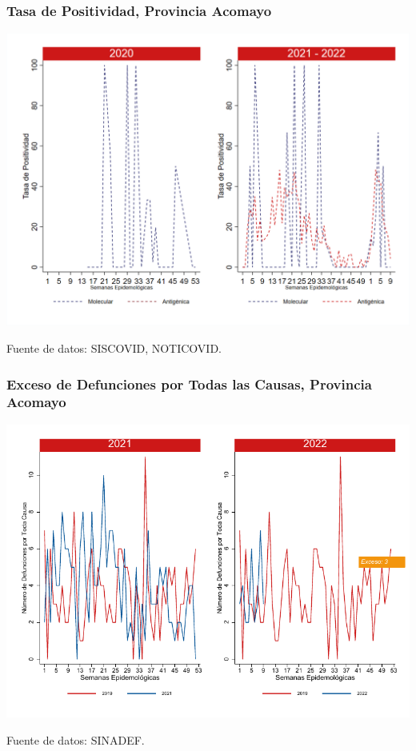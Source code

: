 \documentclass[xcolor=table]{beamer}
\begin{document}
\begin{frame}
	\frametitle{Tasa de Positividad, Provincia Acomayo}
	\vspace{-.5cm}
	\begin{center}
		\includegraphics[width=0.8\linewidth, trim={0cm .5cm 0cm 0.2cm},clip]{../figuras/positividad_20_21_1.png}
	\end{center}
	{\tiny Fuente de datos: SISCOVID, NOTICOVID.}
\end{frame}

\begin{frame}
	\frametitle{Exceso de Defunciones por Todas las Causas, Provincia Acomayo}
	\vspace{-.5cm}
	\begin{center}	
		\includegraphics[width=0.8\linewidth, trim={0cm .5cm 0cm 0.2cm},clip]{../figuras/exceso_1.pdf}
	\end{center}
	{\tiny Fuente de datos: SINADEF.}
	
	\hyperlink{indicadores_provinciales}{}
\end{frame}
\end{document}
